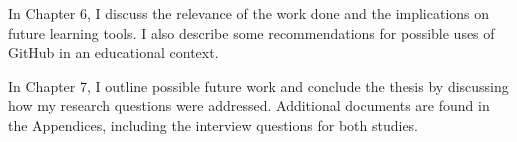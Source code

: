 In Chapter 6, I discuss the relevance of the work done and the implications on future learning tools. I also describe some recommendations for possible uses of GitHub in an educational context.

In Chapter 7, I outline possible future work and conclude the thesis by discussing how my research questions were addressed. Additional documents are found in the Appendices, including the interview questions for both studies.



